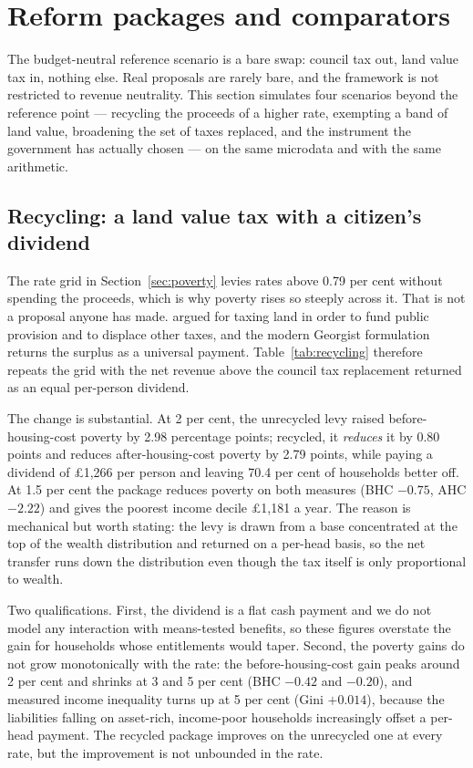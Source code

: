 \section{Reform packages and comparators}
\label{sec:packages}

The budget-neutral reference scenario is a bare swap: council tax out, land value tax in, nothing else. Real proposals are rarely bare, and the framework is not restricted to revenue neutrality. This section simulates four scenarios beyond the reference point --- recycling the proceeds of a higher rate, exempting a band of land value, broadening the set of taxes replaced, and the instrument the government has actually chosen --- on the same microdata and with the same arithmetic.

\subsection{Recycling: a land value tax with a citizen's dividend}
\label{sec:recycling}

The rate grid in Section~\ref{sec:poverty} levies rates above 0.79 per cent without spending the proceeds, which is why poverty rises so steeply across it. That is not a proposal anyone has made. \citet{george1879} argued for taxing land in order to fund public provision and to displace other taxes, and the modern Georgist formulation returns the surplus as a universal payment. Table~\ref{tab:recycling} therefore repeats the grid with the net revenue above the council tax replacement returned as an equal per-person dividend.

The change is substantial. At 2 per cent, the unrecycled levy raised before-housing-cost poverty by 2.98 percentage points; recycled, it \emph{reduces} it by 0.80 points and reduces after-housing-cost poverty by 2.79 points, while paying a dividend of \pounds 1{,}266 per person and leaving 70.4 per cent of households better off. At 1.5 per cent the package reduces poverty on both measures (BHC $-0.75$, AHC $-2.22$) and gives the poorest income decile \pounds 1{,}181 a year. The reason is mechanical but worth stating: the levy is drawn from a base concentrated at the top of the wealth distribution and returned on a per-head basis, so the net transfer runs down the distribution even though the tax itself is only proportional to wealth.

Two qualifications. First, the dividend is a flat cash payment and we do not model any interaction with means-tested benefits, so these figures overstate the gain for households whose entitlements would taper. Second, the poverty gains do not grow monotonically with the rate: the before-housing-cost gain peaks around 2 per cent and shrinks at 3 and 5 per cent (BHC $-0.42$ and $-0.20$), and measured income inequality turns up at 5 per cent (Gini $+0.014$), because the liabilities falling on asset-rich, income-poor households increasingly offset a per-head payment. The recycled package improves on the unrecycled one at every rate, but the improvement is not unbounded in the rate.

